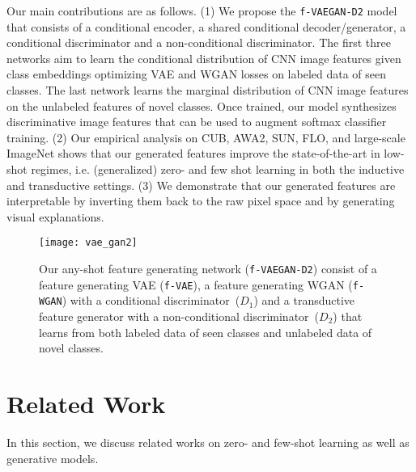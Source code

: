 \documentclass[10pt,twocolumn,letterpaper]{article}
\begin{document}
Our main contributions are as follows. (1) We propose the \texttt{f-VAEGAN-D2} model that consists of a conditional encoder, a shared conditional decoder/generator, a conditional discriminator and a non-conditional discriminator. The first three networks aim to learn the conditional distribution of CNN image features given class embeddings optimizing VAE and WGAN losses on labeled data of seen classes. The last network learns the marginal distribution of CNN image features on the unlabeled features of novel classes. Once trained, our model synthesizes discriminative image features that can be used to augment softmax classifier training. (2) Our empirical analysis on CUB, AWA2, SUN, FLO, and large-scale ImageNet shows that our generated features improve the state-of-the-art in low-shot regimes, i.e. (generalized) zero- and few shot learning in both the inductive and transductive settings. (3) We demonstrate that our generated features are interpretable by inverting them back to the raw pixel space and by generating visual explanations.  

\begin{figure*}[t]
	\centering
        \texttt{[image: vae\_gan2]}
        \vspace{-5mm}
	\caption{Our any-shot feature generating network (\texttt{f-VAEGAN-D2}) consist of a feature generating VAE (\texttt{f-VAE}), a feature generating WGAN (\texttt{f-WGAN}) with a conditional discriminator~($D_1$) and a transductive feature generator with a non-conditional discriminator~($D_2$) that learns from both labeled data of seen classes and unlabeled data of novel classes.}
	\label{fig:model}
\end{figure*}


\section{Related Work}

In this section, we discuss related works on zero- and few-shot learning as well as generative models.
\end{document}
